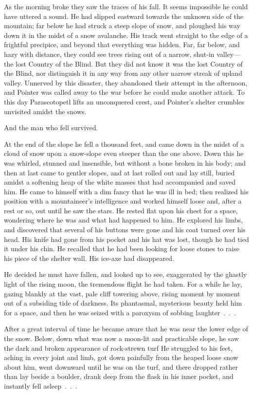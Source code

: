 \documentclass[courier]{sffms}
\begin{document}
As the morning broke they saw the traces of his fall. It seems
impossible he could have uttered a sound. He had slipped eastward
towards the unknown side of the mountain; far below he had struck a
steep slope of snow, and ploughed his way down it in the midst of a
snow avalanche. His track went straight to the edge of a frightful
precipice, and beyond that everything was hidden. Far, far below, and
hazy with distance, they could see trees rising out of a narrow,
shut-in valley---the lost Country of the Blind. But they did not know
it was the lost Country of the Blind, nor distinguish it in any way
from any other narrow streak of upland valley. Unnerved by this
disaster, they abandoned their attempt in the afternoon, and Pointer
was called away to the war before he could make another attack. To
this day Parascotopetl lifts an unconquered crest, and Pointer's
shelter crumbles unvisited amidst the snows.

And the man who fell survived.

At the end of the slope he fell a thousand feet, and came down in the
midst of a cloud of snow upon a snow-slope even steeper than the one
above. Down this he was whirled, stunned and insensible, but without a
bone broken in his body; and then at last came to gentler slopes, and
at last rolled out and lay still, buried amidst a softening heap of
the white masses that had accompanied and saved him. He came to
himself with a dim fancy that he was ill in bed; then realized his
position with a mountaineer's intelligence and worked himself loose
and, after a rest or so, out until he saw the stars. He rested flat
upon his chest for a space, wondering where he was and what had
happened to him. He explored his limbs, and discovered that several of
his buttons were gone and his coat turned over his head. His knife had
gone from his pocket and his hat was lost, though he had tied it under
his chin. He recalled that he had been looking for loose stones to
raise his piece of the shelter wall. His ice-axe had disappeared.

He decided he must have fallen, and looked up to see, exaggerated by
the ghastly light of the rising moon, the tremendous flight he had
taken. For a while he lay, gazing blankly at the vast, pale cliff
towering above, rising moment by moment out of a subsiding tide of
darkness. Its phantasmal, mysterious beauty held him for a space, and
then he was seized with a paroxysm of sobbing laughter~.~.~.

After a great interval of time he became aware that he was near the
lower edge of the snow. Below, down what was now a moon-lit and
practicable slope, he saw the dark and broken appearance of
rock-strewn turf He struggled to his feet, aching in every joint and
limb, got down painfully from the heaped loose snow about him, went
downward until he was on the turf, and there dropped rather than lay
beside a boulder, drank deep from the flask in his inner pocket, and
instantly fell asleep~.~.~.
\end{document}
